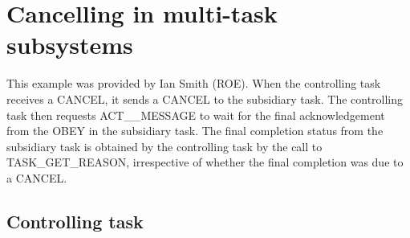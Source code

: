 \documentclass[twoside,11pt,nolof]{starlink}
\begin{document}
\newpage

\section{Cancelling in multi-task subsystems
\label{cmotask}}

This example was provided by Ian Smith (ROE). When the controlling task
receives a CANCEL, it sends a CANCEL to the subsidiary task. The
controlling task then requests ACT\_\_MESSAGE to wait for the
final acknowledgement from the OBEY in the subsidiary task. The final
completion status from the subsidiary task is obtained by the
controlling task by the call to TASK\_GET\_REASON, irrespective of
whether the final completion was due to a CANCEL.

\subsection{Controlling task}
\end{document}
